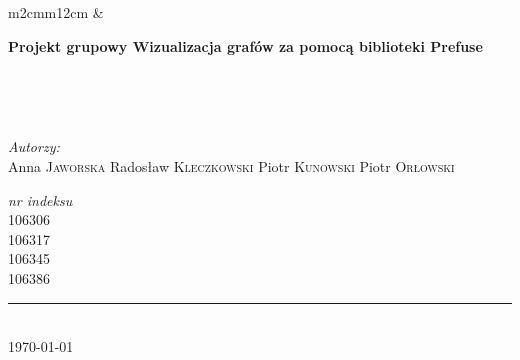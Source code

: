 \begin{titlepage}
\begin{center}
\begin{tabular}{m{2cm}m{12cm}}
 & {\begin{center}
 \huge \bfseries Projekt grupowy \newline Wizualizacja grafów za pomocą biblioteki Prefuse                                                                                                                                                             \end{center}} \\
\end{tabular}


 
\HRule \\[1.9cm]
 
\begin{minipage}{0.4\textwidth}
\begin{flushleft} \large
\emph{Autorzy:}\\
Anna \textsc{Jaworska} \newline
Radosław \textsc{Kleczkowski} \newline
Piotr \textsc{Kunowski} \newline
Piotr \textsc{Orłowski} \newline
\end{flushleft}
\end{minipage}
\begin{minipage}{0.4\textwidth}
\begin{flushright} \large
\emph{nr indeksu} \\
 \textsc{ 106306} \\
 \textsc{ 106317} \\
 \textsc{ 106345} \\
 \textsc{ 106386} \\
\end{flushright}
\end{minipage} 

\rule{\linewidth}{0.0mm} \\[2.5cm]

{\large \today}
 
\end{center}
 
\end{titlepage}
